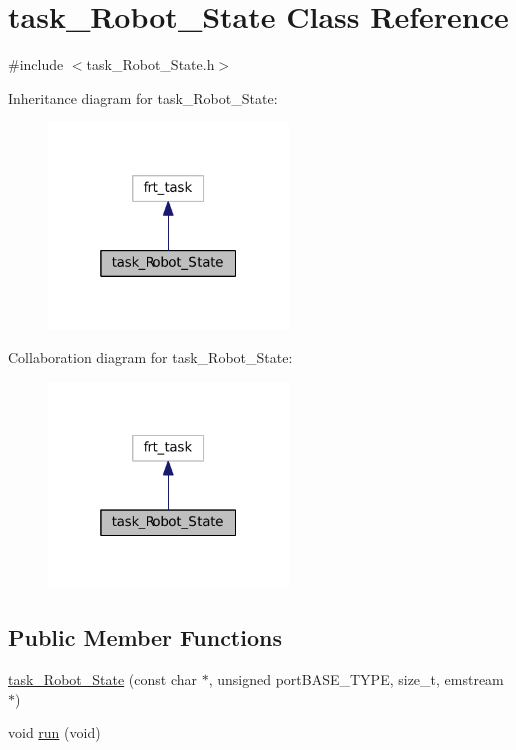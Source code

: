 \hypertarget{classtask__Robot__State}{}\section{task\+\_\+\+Robot\+\_\+\+State Class Reference}
\label{classtask__Robot__State}


{\ttfamily \#include $<$task\+\_\+\+Robot\+\_\+\+State.\+h$>$}



Inheritance diagram for task\+\_\+\+Robot\+\_\+\+State\+:
\nopagebreak
\begin{figure}[H]
\begin{center}
\leavevmode
\includegraphics[width=181pt]{classtask__Robot__State__inherit__graph}
\end{center}
\end{figure}


Collaboration diagram for task\+\_\+\+Robot\+\_\+\+State\+:
\nopagebreak
\begin{figure}[H]
\begin{center}
\leavevmode
\includegraphics[width=181pt]{classtask__Robot__State__coll__graph}
\end{center}
\end{figure}
\subsection*{Public Member Functions}
\begin{DoxyCompactItemize}
\item 
\mbox{\hyperlink{classtask__Robot__State_af64f9fb28ae6d78ce60bd20950aed12e}{task\+\_\+\+Robot\+\_\+\+State}} (const char $\ast$, unsigned port\+B\+A\+S\+E\+\_\+\+T\+Y\+PE, size\+\_\+t, emstream $\ast$)
\item 
void \mbox{\hyperlink{classtask__Robot__State_a4e8467dcb9a3311f8ecbbd5a740bec46}{run}} (void)
\end{DoxyCompactItemize}
